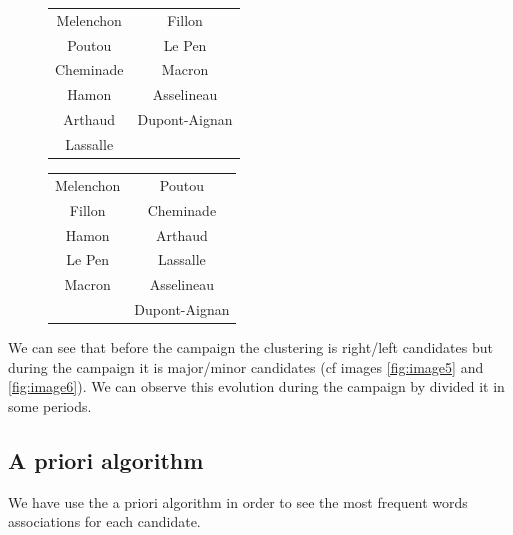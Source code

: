 \documentclass[a4paper]{article}
\theoremstyle{definition}
\begin{document}
\begin{figure}
\begin{center}
\begin{multicols}{2}
\begin{tabular}{ | c | c |}
\hline
Melenchon & Fillon\\
Poutou & Le Pen\\
Cheminade & Macron\\
Hamon & Asselineau\\
Arthaud & Dupont-Aignan\\
Lassalle & \\
\hline
\end{tabular}
\bigskip

\begin{tabular}{ | c | c |}
\hline
Melenchon & Poutou\\
Fillon & Cheminade\\
Hamon & Arthaud\\
Le Pen & Lassalle\\
Macron & Asselineau\\
& Dupont-Aignan\\
\hline
\end{tabular}
\bigskip
{}
\end{multicols}
\end{center}
\end{figure}

We can see that before the campaign the clustering is right/left candidates but during the campaign it is major/minor candidates (cf images \ref{fig:image5} and \ref{fig:image6}). We can observe this evolution during the campaign by divided it in some periods.


\subsection{A priori algorithm}
We have use the a priori algorithm in order to see the most frequent words associations for each candidate.
\end{document}
